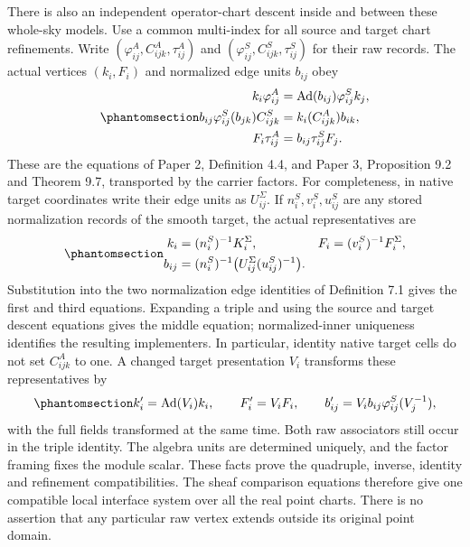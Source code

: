 \documentclass[
  english,
  11pt,
  reqno]{amsart}
\begin{document}
There is also an independent operator-chart descent inside and between
these whole-sky models. Use a common multi-index for all source and
target chart refinements. Write
\((\varphi^A_{ij},C^A_{ijk},\tau^A_{ij})\) and
\((\varphi^S_{ij},C^S_{ijk},\tau^S_{ij})\) for their raw records. The
actual vertices \((k_i,F_i)\) and normalized edge units \(b_{ij}\) obey
\begin{equation}\protect\phantomsection\label{eq:analytic-global-three-stored-comparisons}{
\begin{aligned}
k_i\varphi^A_{ij}
 &=\operatorname{Ad}(b_{ij})\varphi^S_{ij}k_j,\\
b_{ij}\varphi^S_{ij}(b_{jk})C^S_{ijk}
 &=k_i(C^A_{ijk})b_{ik},\\
F_i\tau^A_{ij}
 &=b_{ij}\tau^S_{ij}F_j.
\end{aligned}
}\end{equation} These are the equations of Paper 2, Definition 4.4, and
Paper 3, Proposition 9.2 and Theorem 9.7, transported by the carrier
factors. For completeness, in native target coordinates write their edge
units as \(U^{\Sigma}_{ij}\). If \(n_i^S,v_i^S,u_{ij}^S\) are any stored
normalization records of the smooth target, the actual representatives
are
\begin{equation}\protect\phantomsection\label{eq:analytic-global-stored-target-formula}{
\begin{aligned}
k_i&=(n_i^S)^{-1}K_i^\Sigma,
&F_i&=(v_i^S)^{-1}F_i^\Sigma,\\
b_{ij}
 &=(n_i^S)^{-1}
       \bigl(U^{\Sigma}_{ij}(u_{ij}^S)^{-1}\bigr).
\end{aligned}
}\end{equation} Substitution into the two normalization edge identities
of Definition 7.1 gives the first and third equations. Expanding a
triple and using the source and target descent equations gives the
middle equation; normalized-inner uniqueness identifies the resulting
implementers. In particular, identity native target cells do not set
\(C^A_{ijk}\) to one. A changed target presentation \(V_i\) transforms
these representatives by
\begin{equation}\protect\phantomsection\label{eq:analytic-global-interface-presentation-change}{
k'_i=\operatorname{Ad}(V_i)k_i,
\qquad F'_i=V_iF_i,
\qquad b'_{ij}=V_i b_{ij}\varphi^S_{ij}(V_j^{-1}),
}\end{equation} with the full fields transformed at the same time. Both
raw associators still occur in the triple identity. The algebra units
are determined uniquely, and the factor framing fixes the module scalar.
These facts prove the quadruple, inverse, identity and refinement
compatibilities. The sheaf comparison equations therefore give one
compatible local interface system over all the real point charts. There
is no assertion that any particular raw vertex extends outside its
original point domain.
\end{document}
